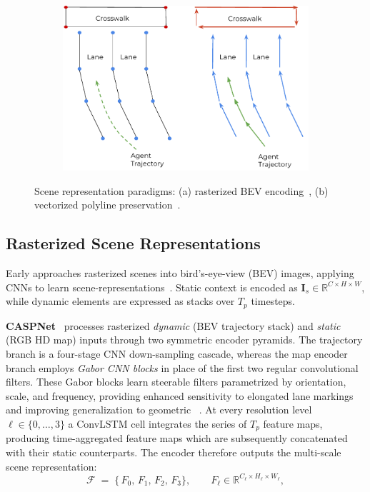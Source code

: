 \begin{figure}[H]
\begin{subfigure}[t]{0.35\textwidth}
\end{subfigure}
\hfill
\begin{subfigure}[t]{0.37\textwidth}
    \centering
    \includegraphics[width=\textwidth]{figures/vectornet-2020-vector-repr.pdf}
    \label{fig:vectorized}
\end{subfigure}
\caption{Scene representation paradigms: (a) rasterized BEV encoding~\cite{caspnetSchäfer2022}, (b) vectorized polyline preservation~\cite{gao2020vectornet}.}
\label{fig:scene_representations}
\end{figure}

\subsection{Rasterized Scene Representations}
Early approaches rasterized scenes into bird's-eye-view (BEV) images, applying CNNs to learn scene-representations~\cite{cui2019multimodal,chai2019multipath}. Static context is encoded as \(\mathbf{I}_s \in \mathbb{R}^{C \times H \times W}\), while dynamic elements are expressed as stacks over \(T_p\) timesteps.

\textbf{CASPNet}~\cite{caspnetSchäfer2022} processes rasterized \emph{dynamic} (BEV trajectory stack) and \emph{static} (RGB HD map) inputs through two symmetric encoder pyramids. The trajectory branch is a four-stage CNN down-sampling cascade, whereas the map encoder branch employs \emph{Gabor CNN blocks} in place of the first two regular convolutional filters. These Gabor blocks learn steerable filters parametrized by orientation, scale, and frequency, providing enhanced sensitivity to elongated lane markings and improving generalization to geometric ~\cite{Luan2018GCNN}. At every resolution level~\( \ell \in \{0, \ldots, 3 \} \) a ConvLSTM cell integrates the series of \( T_p \) feature maps, producing time-aggregated feature maps which are subsequently concatenated with their static counterparts.
 The encoder therefore outputs the multi-scale scene representation:
\begin{equation}
\label{eq:caspnet_scene_repr}
\mathcal{F}
  \;=\;
  \bigl\{\,F_{0},\,F_{1},\,F_{2},\,F_{3}\bigr\},
\qquad
F_{\ell}\in\mathbb{R}^{C_{\ell}\times H_{\ell}\times W_{\ell}},
\end{equation}

